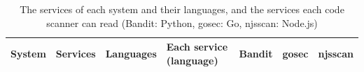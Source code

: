 \begin{table}[!t]
\caption{The services of each system and their languages, and the services each code scanner can read (Bandit: Python, gosec: Go, njsscan: Node.js)}
\label{tab:syslangs}
\centering
\scriptsize
\setlength{\tabcolsep}{3pt}
\begin{tabular}{@{}lr>{\raggedright\arraybackslash}p{2.5cm}>{\raggedright\arraybackslash}p{8.4cm}rrr@{}}
\toprule
System & Services & Languages & Each service (language) & Bandit & gosec & njsscan \\
\midrule
\bottomrule
\end{tabular}
\end{table}

